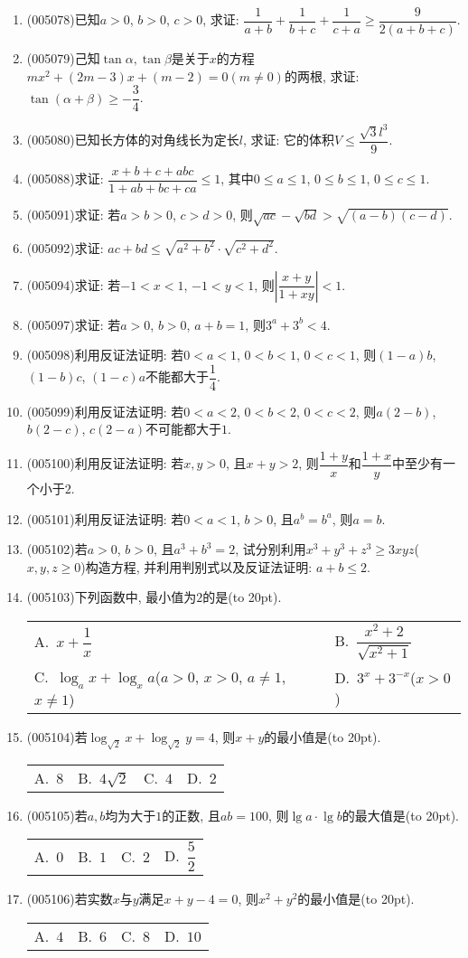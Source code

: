 \documentclass[10pt,a4paper]{article}
\newcommand{\bracket}[1]{(\hbox to #1pt{})}
\newcommand{\twoch}[4]{\par\begin{tabular}{p{.46\textwidth}p{.46\textwidth}}
A.~#1& B.~#2\\
C.~#3& D.~#4
\end{tabular}}
\newcommand{\fourch}[4]{\par\begin{tabular}{p{.23\textwidth}p{.23\textwidth}p{.23\textwidth}p{.23\textwidth}}
A.~#1 &B.~#2& C.~#3& D.~#4
\end{tabular}}
\begin{document}
\begin{enumerate}[1.]
\item {\tiny (005078)}已知$a>0$, $b>0$, $c>0$, 求证: $\dfrac 1{a+b}+\dfrac 1{b+c}+\dfrac 1{c+a}\ge \dfrac 9{2(a+b+c)}$.
\item {\tiny (005079)}己知$\tan \alpha,\tan \beta$是关于$x$的方程$mx^2+(2m-3)x+(m-2)=0(m\ne 0)$的两根, 求证: $\tan (\alpha +\beta)\ge -\dfrac 34$.
\item {\tiny (005080)}已知长方体的对角线长为定长$l$, 求证: 它的体积$V\le \dfrac{\sqrt 3l^3}9$.
\item {\tiny (005088)}求证: $\dfrac{x+b+c+abc}{1+ab+bc+ca}\le 1$, 其中$0\le a\le 1$, $0\le b\le 1$, $0\le c\le 1$.
\item {\tiny (005091)}求证: 若$a>b>0$, $c>d>0$, 则$\sqrt{ac}-\sqrt{bd}>\sqrt{(a-b)(c-d)}$.
\item {\tiny (005092)}求证: $ac+bd\le \sqrt{a^2+b^2}\cdot \sqrt{c^2+d^2}$.
\item {\tiny (005094)}求证: 若$-1<x<1$, $-1<y<1$, 则$|\dfrac{x+y}{1+xy}|<1$.
\item {\tiny (005097)}求证: 若$a>0$, $b>0$, $a+b=1$, 则$3^a+3^b<4$.
\item {\tiny (005098)}利用反证法证明: 若$0<a<1$, $0<b<1$, $0<c<1$, 则$(1-a)b$, $(1-b)c$, $(1-c)a$不能都大于$\dfrac 14$.
\item {\tiny (005099)}利用反证法证明: 若$0<a<2$, $0<b<2$, $0<c<2$, 则$a(2-b)$, $b(2-c)$, $c(2-a)$不可能都大于$1$.
\item {\tiny (005100)}利用反证法证明: 若$x,y>0$, 且$x+y>2$, 则$\dfrac{1+y}x$和$\dfrac{1+x}y$中至少有一个小于$2$.
\item {\tiny (005101)}利用反证法证明: 若$0<a<1$, $b>0$, 且$a^b=b^a$, 则$a=b$.
\item {\tiny (005102)}若$a>0$, $b>0$, 且$a^3+b^3=2$, 试分别利用$x^3+y^3+z^3\ge 3xyz$($x,y,z\ge 0$)构造方程, 并利用判别式以及反证法证明: $a+b\le 2$.
\item {\tiny (005103)}下列函数中, 最小值为$2$的是\bracket{20}.
\twoch{$x+\dfrac 1x$}{$\dfrac{x^2+2}{\sqrt{x^2+1}}$}{$\log_ax+\log_xa$($a>0$, $x>0$, $a\ne 1$, $x\ne 1$)}{$3^x+3^{-x}$($x>0$)}
\item {\tiny (005104)}若$\log_{\sqrt 2}x+\log_{\sqrt 2}y=4$, 则$x+y$的最小值是\bracket{20}.
\fourch{$8$}{$4\sqrt 2$}{$4$}{$2$}
\item {\tiny (005105)}若$a,b$均为大于$1$的正数, 且$ab=100$, 则$\lg a\cdot \lg b$的最大值是\bracket{20}.
\fourch{$0$}{$1$}{$2$}{$\dfrac 52$}
\item {\tiny (005106)}若实数$x$与$y$满足$x+y-4=0$, 则$x^2+y^2$的最小值是\bracket{20}.
\fourch{$4$}{$6$}{$8$}{$10$}

\end{enumerate}
\end{document}
